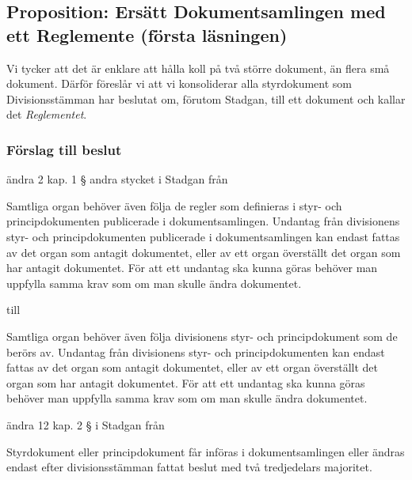 \documentclass[protokoll]{dvd}
\begin{document}
\newpage
\subsection{Proposition: Ersätt Dokumentsamlingen med ett Reglemente (första läsningen)}

Vi tycker att det är enklare att hålla koll på två större dokument, än flera små dokument.
Därför föreslår vi att vi konsoliderar alla styrdokument som Divisionsstämman har beslutat om, förutom Stadgan, till ett dokument och kallar det \emph{Reglementet}.

\subsubsection*{Förslag till beslut}

\begin{attsatser}
	\item ändra 2 kap. 1 § andra stycket i Stadgan från

	\begin{displayquote}
		Samtliga organ behöver även följa de regler som definieras i styr- och principdokumenten publicerade i dokumentsamlingen.
		Undantag från divisionens styr- och principdokumenten publicerade i dokumentsamlingen kan endast fattas av det organ som antagit dokumentet, eller av ett organ överställt det organ som har antagit dokumentet.
		För att ett undantag ska kunna göras behöver man uppfylla samma krav som om man skulle ändra dokumentet.
	\end{displayquote}

	till

	\begin{displayquote}
		Samtliga organ behöver även följa divisionens styr- och principdokument som de berörs av.
		Undantag från divisionens styr- och principdokumenten kan endast fattas av det organ som antagit dokumentet, eller av ett organ överställt det organ som har antagit dokumentet.
		För att ett undantag ska kunna göras behöver man uppfylla samma krav som om man skulle ändra dokumentet.
	\end{displayquote}

	\item ändra 12 kap. 2 § i Stadgan från

	\begin{displayquote}
		Styrdokument eller principdokument får införas i dokumentsamlingen eller ändras endast efter divisionsstämman fattat beslut med två tredjedelars majoritet.


\end{displayquote}
\end{attsatser}
\end{document}
